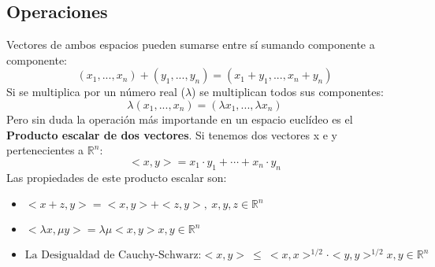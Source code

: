 \documentclass[11pt]{article}
\newcommand{\R}{\mathbb{R}}
\theoremstyle{plain}
\begin{document}
        \subsection{Operaciones} %
        \label{sub:operaciones}
            Vectores de ambos espacios pueden sumarse entre sí sumando componente a componente:
            \begin{equation}
                (x_{1},...,x_{n}) + (y_{1},...,y_{n}) = (x_{1}+y_{1},...,x_{n}+y_{n})
            \end{equation}
        Si se multiplica por un número real ($\lambda$) se multiplican todos sus componentes:
            \begin{equation}
                \lambda (x_{1},...,x_{n}) = (\lambda x_{1},...,\lambda x_{n})
            \end{equation}
        Pero sin duda la operación más importande en un espacio euclídeo es el \textbf{Producto escalar de dos vectores}. Si tenemos dos vectores x e y pertenecientes a $\mathbb{R}^n$:
            \begin{equation}
                <x,y> = x_1 \cdot y_1 + \cdots + x_n \cdot y_n
            \end{equation}
        Las propiedades de este producto escalar son:
            \begin{itemize}
                \item $<x+z, y> = <x,y> + <z,y>, \ x,y,z \in \R^n$

                \item $<\lambda x, \mu y> = \lambda \mu <x,y> x,y \in \R^n$
                \item $ \text{La Desigualdad de Cauchy-Schwarz:}< x, y > \ \le \  <x,x>^{1/2} \cdot <y,y> ^ {1/2} x,y \in \mathbb{R}^n$
            \end{itemize}
\end{document}
